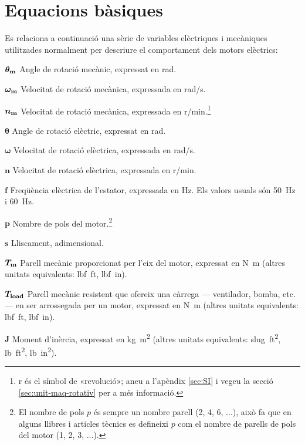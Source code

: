 \section{Equacions bàsiques}

Es relaciona a continuació una sèrie de variables elèctriques i mecàniques utilitzades normalment per descriure el comportament dels motors elèctrics:

\begin{list}{}
   {\setlength{\labelwidth}{12mm} \setlength{\leftmargin}{12mm} \setlength{\labelsep}{2mm}}
   \item[$\boldsymbol{\theta_\mathrm{m}}$] Angle de rotació mecànic, expressat en \unit{rad}.
   \item[$\boldsymbol{\omega_\mathrm{m}}$] Velocitat de rotació mecànica, expressada en \unit{rad/s}.
   \item[$\boldsymbol{n_\mathrm{m}}$] Velocitat de rotació mecànica, expressada en \unit{r/min}.\footnote{r és el símbol de «revolució»; aneu a l'apèndix \ref{sec:SI} i vegeu la secció \ref{sec:unit-maq-rotativ} per a més informació.}
   \item[$\boldsymbol{\theta}$] Angle de rotació elèctric, expressat en \unit{rad}.
   \item[$\boldsymbol{\omega}$] Velocitat de rotació elèctrica, expressada en \unit{rad/s}.
   \item[$\boldsymbol{n}$] Velocitat de rotació elèctrica, expressada en \unit{r/min}.
   \item[$\boldsymbol{f}$] Freqüència elèctrica de l'estator, expressada en \unit{Hz}. Els valors usuals són \qty{50}{Hz} i \qty{60}{Hz}.
   \item[$\boldsymbol{p}$] Nombre de pols del motor.\footnote{El nombre de pols $p$  és sempre un nombre parell (2, 4, 6, ...), això fa que en alguns llibres i articles tècnics es defineixi $p$ com el nombre de parells de pols del motor       (1, 2, 3, ...).}
   \item[$\boldsymbol{s}$] Lliscament, adimensional.
   \item[$\boldsymbol{T_\mathrm{m}}$] Parell mecànic proporcionat per l'eix del motor, expressat en \unit{N.m} (altres unitats equivalents: \unit{lbf.ft}, \unit{lbf.in}).
   \item[$\boldsymbol{T_\mathrm{load}}$] Parell mecànic resistent que ofereix una càrrega --- ventilador, bomba, etc. --- en ser arrossegada per un motor, expressat en \unit{N.m} (altres unitats equivalents: \unit{lbf.ft}, \unit{lbf.in}).
   \item[$\boldsymbol{J}$] Moment d'inèrcia, expressat en \unit{kg.m^2} (altres unitats equivalents: \unit{slug.ft^2}, \unit{lb.ft^2}, \unit{lb.in^2}).

\end{list}
